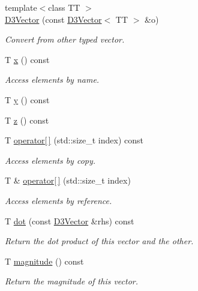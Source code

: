 \begin{DoxyCompactItemize}
\item 
{\footnotesize template$<$class TT $>$ }\\\hyperlink{class_wire_cell_1_1_d3_vector_ad414a22a14615b94d30980ee34f1cfd9}{D3\+Vector} (const \hyperlink{class_wire_cell_1_1_d3_vector}{D3\+Vector}$<$ TT $>$ \&o)
\begin{DoxyCompactList}\small\item\em Convert from other typed vector. \end{DoxyCompactList}\item 
T \hyperlink{class_wire_cell_1_1_d3_vector_a65c5efb75f44d8bb1b7979151f442c09}{x} () const
\begin{DoxyCompactList}\small\item\em Access elements by name. \end{DoxyCompactList}\item 
T \hyperlink{class_wire_cell_1_1_d3_vector_ad570e3dbb22e60a480ced87c278f4466}{y} () const
\item 
T \hyperlink{class_wire_cell_1_1_d3_vector_a75a340da006d17ee06a8c097fa09c25f}{z} () const
\item 
T \hyperlink{class_wire_cell_1_1_d3_vector_ac5cfef3dd3a6886c86ad58f020bb2ab4}{operator\mbox{[}$\,$\mbox{]}} (std\+::size\+\_\+t index) const
\begin{DoxyCompactList}\small\item\em Access elements by copy. \end{DoxyCompactList}\item 
T \& \hyperlink{class_wire_cell_1_1_d3_vector_a7e5f8ace33d45da46becde8152e652ac}{operator\mbox{[}$\,$\mbox{]}} (std\+::size\+\_\+t index)
\begin{DoxyCompactList}\small\item\em Access elements by reference. \end{DoxyCompactList}\item 
T \hyperlink{class_wire_cell_1_1_d3_vector_ad116deec8357b27dcad6be127c209490}{dot} (const \hyperlink{class_wire_cell_1_1_d3_vector}{D3\+Vector} \&rhs) const
\begin{DoxyCompactList}\small\item\em Return the dot product of this vector and the other. \end{DoxyCompactList}\item 
T \hyperlink{class_wire_cell_1_1_d3_vector_aa05f4bdb8795cfa6565042177b5567cd}{magnitude} () const
\begin{DoxyCompactList}\small\item\em Return the magnitude of this vector. \end{DoxyCompactList}\item 

\end{DoxyCompactItemize}
